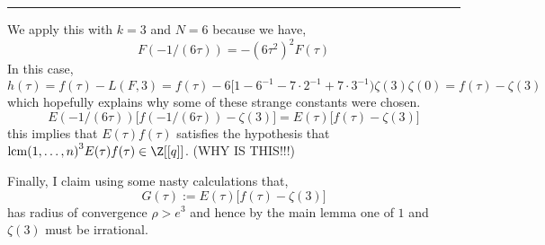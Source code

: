 \documentclass[12pt]{article}
\begin{document}
\par\noindent\rule{\textwidth}{0.4pt}
We apply this with $k = 3$ and $N = 6$ because we have,
\[ F(-1/(6 \tau)) = - (6 \tau^2)^2 F(\tau) \] 
In this case,
\[ h(\tau) = f(\tau) - L(F, 3) = f(\tau) - 6 [1 - 6^{-1} - 7 \cdot 2^{-1} + 7 \cdot 3^{-1}) \zeta(3) \zeta(0) = f(\tau) - \zeta(3) \]
which hopefully explains why some of these strange constants were chosen. 
\[ E(-1/(6 \tau)) \big[ f(-1/(6 \tau)) - \zeta(3) \big] = E(\tau) \big[ f(\tau) - \zeta(3) \big] \]
this implies that $E(\tau) f(\tau)$ satisfies the hypothesis that $\lcm{(1, \dots, n)}^3 E(\tau) f(\tau) \in \Z[[q]]$. (WHY IS THIS!!!)

Finally, I claim using some nasty calculations that,
\[ G(\tau) := E(\tau) \big[ f(\tau) - \zeta(3) \big] \]
has radius of convergence $\rho > e^3$ and hence by the main lemma one of $1$ and $\zeta(3)$ must be irrational.  
\end{document}
